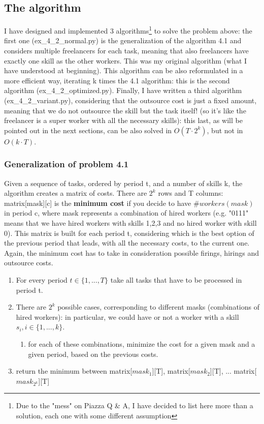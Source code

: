 \subsection{The algorithm}
I have designed and implemented 3 algorithms\footnote{Due to the "mess" on Piazza Q \& A, I have decided to list here more than a solution, each one with some different assumption} to solve the problem above: the first one (ex\_4\_2\_normal.py) is the generalization of the algorithm 4.1 and considers multiple freelancers for each task, meaning that also freelancers have exactly one skill as the other workers. This was my original algorithm (what I have understood at beginning). This algorithm can be also reformulated in a more efficient way, iterating k times the 4.1 algorithm: this is the second algorithm (ex\_4\_2\_optimized.py). Finally, I have written a third algorithm (ex\_4\_2\_variant.py), considering that the outsource cost is just a fixed amount, meaning that we do not outsource the skill but the task itself! (so it's like the freelancer is a super worker with all the necessary skills): this last, as will be pointed out in the next sections, can be also solved in $O(T \cdot 2^k)$, but not in $O(k \cdot T)$.

\subsubsection{Generalization of problem 4.1}
Given a sequence of tasks, ordered by period t, and a number of skills k, the algorithm creates a matrix of costs. There are $2^k$ rows and T columns: matrix[mask][c] is the \textbf{minimum cost} if you decide to have $\# workers(mask)$ in period c, where mask represents a combination of hired workers (e.g. "0111" means that we have hired workers with skills 1,2,3 and no hired worker with skill 0). This matrix is built for each period t, considering which is the best option of the previous period that leads, with all the necessary costs, to the current one. Again, the minimum cost has to take in consideration possible firings, hirings and outsource costs.
\begin{enumerate}
	\item For every period $t \in \{1,..., T\}$ take all tasks that have to be processed in period t.
	\item There are $2^k$ possible cases, corresponding to different masks (combinations of hired workers): in particular, we could have or not a worker with a skill $s_i, i \in \{1, ..., k\}$.
	\begin{enumerate}
		\item for each of these combinations, minimize the cost for a given mask and a given period, based on the previous costs.
	\end{enumerate}
	\item return the minimum between matrix[$mask_1$][T], matrix[$mask_2$][T], ... matrix[$mask_{2^k}$][T]
\end{enumerate}

